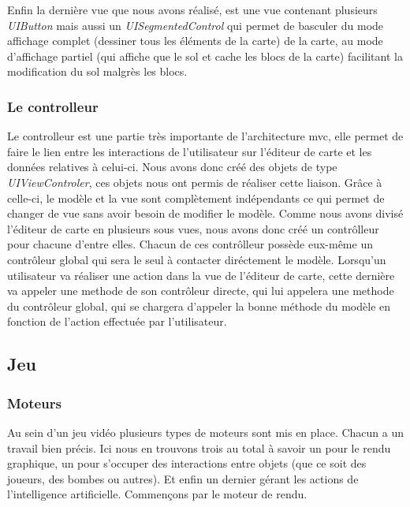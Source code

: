 {		\begin{center}
		\end{center}
		Enfin la dernière vue que nous avons réalisé, est une vue contenant plusieurs \textit{UIButton} mais aussi un \textit{UISegmentedControl} qui permet de basculer du mode affichage complet (dessiner tous les éléments de la carte) de la carte, au mode d'affichage partiel (qui affiche que le sol et cache les blocs de la carte) facilitant la modification du sol malgrès les blocs.
			
			
	\subsubsection{Le controlleur}
		
		Le controlleur est une partie très importante de l'architecture \gls{mvc}, elle permet de faire le lien entre les interactions de l'utilisateur sur l'éditeur de carte et les données relatives à celui-ci. Nous avons  donc créé des objets de type \textit{UIViewControler}, ces objets nous ont permis de réaliser cette liaison. Grâce à celle-ci, le modèle et la vue sont complètement indépendants ce qui permet de changer de vue sans avoir besoin de modifier le modèle. Comme nous avons divisé l'éditeur de carte en plusieurs sous vues, nous avons donc créé un contrôlleur pour chacune d'entre elles. Chacun de ces contrôlleur possède eux-même un contrôleur global qui sera le seul à contacter diréctement le modèle. Lorsqu'un utilisateur va réaliser une action dans la vue de l'éditeur de carte, cette dernière va appeler une methode de son contrôleur directe, qui lui appelera une methode du contrôleur global, qui se chargera d'appeler la bonne méthode du modèle en fonction de l'action effectuée par l'utilisateur. 



\subsection{Jeu}

	\subsubsection{Moteurs}
	
		Au sein d'un jeu vidéo plusieurs types de moteurs sont mis en place.
		Chacun a un travail bien précis.
		Ici nous en trouvons trois au total à savoir un pour le rendu graphique, un
		pour s'occuper des interactions entre objets (que ce soit des joueurs, des bombes ou autres). Et enfin un dernier gérant
		les actions de l'intelligence artificielle.
		Commençons par le moteur de rendu.
	
}

